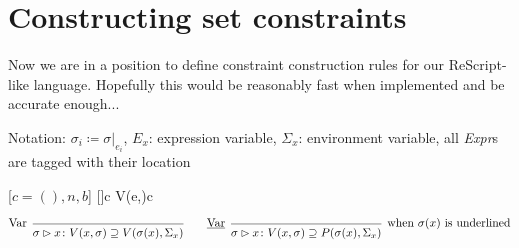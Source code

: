 \documentclass{article}
\newcommand*\vbar{|}
\begin{document}
\section{Constructing set constraints}

Now we are in a position to define constraint construction rules for our ReScript-like language. Hopefully this would be reasonably fast when implemented and be accurate enough...

Notation: $\sigma_{i}\coloneq\sigma\vbar_{e_{i}}$, $E_{x}$: expression variable, $\Sigma_{x}$: environment variable, all \textit{Expr}s are tagged with their location


\begin{prooftree*}
    [$c=(),n,b$] {[]\rhd c \colon V(e,\sigma)\supseteq c}
\end{prooftree*}

\begin{prooftree*}
\end{prooftree*}

\begin{prooftree*}
\end{prooftree*}

\[
\begin{prooftree}
  \infer[left label=Var]0{
    \sigma \rhd x \colon V(x, \sigma)\supseteq V(\sigma(x),\Sigma_x)}
\end{prooftree}
\qquad
\begin{prooftree}
  \infer[left label=\underline{Var}]0[when $\sigma(x)$ is underlined]{
    \sigma \rhd x \colon V(x, \sigma)\supseteq P(\sigma(x),\Sigma_x)}
\end{prooftree}
\]
\end{document}

